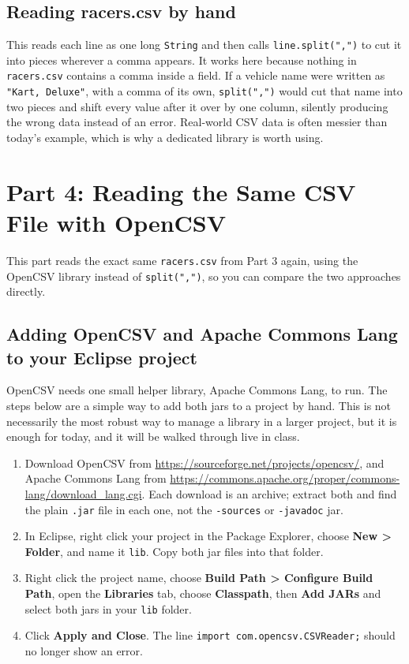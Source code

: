 \documentclass[11pt]{article}
\begin{document}


\subsection{Reading racers.csv by hand}



This reads each line as one long \texttt{String} and then calls
\texttt{line.split(",")} to cut it into pieces wherever a comma
appears. It works here because nothing in \texttt{racers.csv}
contains a comma inside a field. If a vehicle name were written as
\texttt{"Kart, Deluxe"}, with a comma of its own, \texttt{split(",")}
would cut that name into two pieces and shift every value after it
over by one column, silently producing the wrong data instead of an
error. Real-world CSV data is often messier than today's example,
which is why a dedicated library is worth using.

\section{Part 4: Reading the Same CSV File with OpenCSV}

This part reads the exact same \texttt{racers.csv} from Part 3 again,
using the OpenCSV library instead of \texttt{split(",")}, so you can
compare the two approaches directly.

\subsection{Adding OpenCSV and Apache Commons Lang to your Eclipse project}

OpenCSV needs one small helper library, Apache Commons Lang, to run.
The steps below are a simple way to add both jars to a project by
hand. This is not necessarily the most robust way to manage a library
in a larger project, but it is enough for today, and it will be
walked through live in class.

\begin{enumerate}[itemsep=2pt]
  \item Download OpenCSV from
    \url{https://sourceforge.net/projects/opencsv/}, and Apache
    Commons Lang from
    \url{https://commons.apache.org/proper/commons-lang/download_lang.cgi}.
    Each download is an archive; extract both and find the plain
    \texttt{.jar} file in each one, not the \texttt{-sources} or
    \texttt{-javadoc} jar.
  \item In Eclipse, right click your project in the Package Explorer,
    choose \textbf{New > Folder}, and name it \texttt{lib}. Copy both
    jar files into that folder.
  \item Right click the project name, choose
    \textbf{Build Path > Configure Build Path}, open the
    \textbf{Libraries} tab, choose \textbf{Classpath}, then
    \textbf{Add JARs} and select both jars in your \texttt{lib}
    folder.
  \item Click \textbf{Apply and Close}. The line
    \texttt{import com.opencsv.CSVReader;} should no longer show an
    error.
\end{enumerate}
\end{document}
